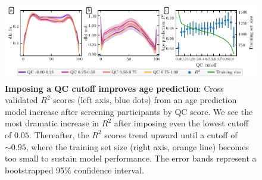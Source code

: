 \documentclass[fleqn,10pt,inline]{wlscirep}
\begin{document}
\begin{figure}[tbp]
{    }
    \label{fig:qc-profiles:md}
    \label{figsupp:qc-profiles:fa}
\end{figure}

\begin{figure}
    \includegraphics[width=\hsize]{age-prediction/qc_sweep.pdf}
    \caption{%
        {\bf Imposing a QC cutoff improves age prediction}:
        Cross validated $R^2$ scores (left axis, blue dots) from an age
        prediction model increase after screening participants by QC score. We see
        the most dramatic increase in $R^2$ after imposing even the lowest
        cutoff of $0.05$. Thereafter, the $R^2$ scores trend upward until a
        cutoff of $\sim 0.95$, where the training set size (right axis, orange
        line) becomes too small to sustain model performance. The error bands
        represent a bootstrapped 95\% confidence interval.
    }
    \label{fig:age-prediction}
\end{figure}
\end{document}
